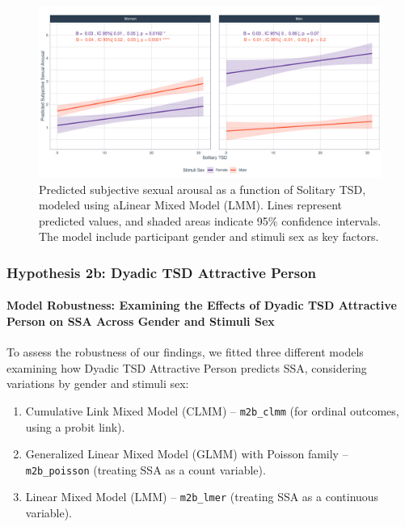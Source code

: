 \documentclass[
  bookmarksnumbered]{article}
\providecommand{\tightlist}{%
  \setlength{\itemsep}{0pt}\setlength{\parskip}{0pt}}
\begin{document}
\begin{figure}
\centering
\includegraphics{Sexual_Desire_Arousal_anonymous_files/figure-latex/fig-h2a-1.pdf}
\caption{\label{fig:fig-h2a}Predicted subjective sexual arousal as a function of Solitary TSD, modeled using aLinear Mixed Model (LMM). Lines represent predicted values, and shaded areas indicate 95\% confidence intervals. The model include participant gender and stimuli sex as key factors.}
\end{figure}

\subsubsection{Hypothesis 2b: Dyadic TSD Attractive Person}\label{hyp2b}

\paragraph{Model Robustness: Examining the Effects of Dyadic TSD Attractive Person on SSA Across Gender and Stimuli Sex}\label{model-robustness-examining-the-effects-of-dyadic-tsd-attractive-person-on-ssa-across-gender-and-stimuli-sex}

To assess the robustness of our findings, we fitted three different models examining how Dyadic TSD Attractive Person predicts SSA, considering variations by gender and stimuli sex:

\begin{enumerate}
\def\labelenumi{\arabic{enumi}.}
\tightlist
\item
  Cumulative Link Mixed Model (CLMM) -- \texttt{m2b\_clmm} (for ordinal outcomes, using a probit link).
\item
  Generalized Linear Mixed Model (GLMM) with Poisson family -- \texttt{m2b\_poisson} (treating SSA as a count variable).
\item
  Linear Mixed Model (LMM) -- \texttt{m2b\_lmer} (treating SSA as a continuous variable).
\end{enumerate}
\end{document}
